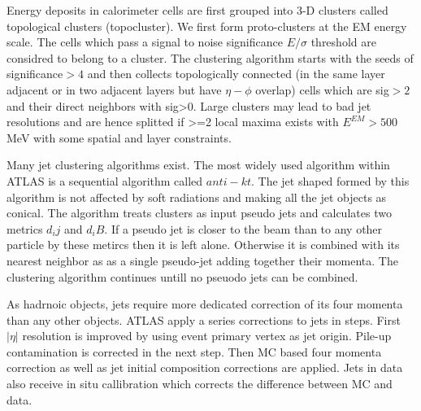 Energy deposits in calorimeter cells are first grouped into 3-D clusters called topological clusters (topocluster)\cite{PERF-2014-07}. We first form proto-clusters at the EM energy scale. The cells which pass a signal to noise significance $E/\sigma$  threshold are considred to belong to a cluster. The clustering algorithm starts with the seeds of significance$>4$ and then collects topologically connected (in the same layer adjacent or in two adjacent layers but have $\eta- \phi$ overlap) cells which are sig$>2$ and their direct neighbors with sig>0. Large clusters may lead to bad jet resolutions and are hence splitted if >=2 local maxima exists with $E^{EM}>500$ MeV with some spatial and layer constraints.

Many jet clustering algorithms exist. The most widely used algorithm within ATLAS is a sequential algorithm called $anti-kt$\cite{Cacciari:2008gp}. The jet shaped formed by this algorithm is not affected by soft radiations and making all the jet objects as conical. The algorithm treats clusters as input pseudo jets and calculates two metrics $d_ij$ and $d_iB$. If a pseudo jet is closer to the beam than to any other particle by these metircs then it is left alone. Otherwise it is combined with its nearest neighbor as as a single pseudo-jet adding together their momenta. The clustering algorithm continues untill no pseuodo jets can be combined.

As hadrnoic objects, jets require more dedicated correction of its four momenta than any other objects. ATLAS apply a series corrections\cite{PERF-2016-04} to jets in steps. First $|\eta|$ resolution is improved by using event primary vertex as jet origin. Pile-up contamination is corrected in the next step. Then MC based four momenta correction as well as jet initial composition corrections are applied. Jets in data also receive in situ callibration which corrects the difference between MC and data.

